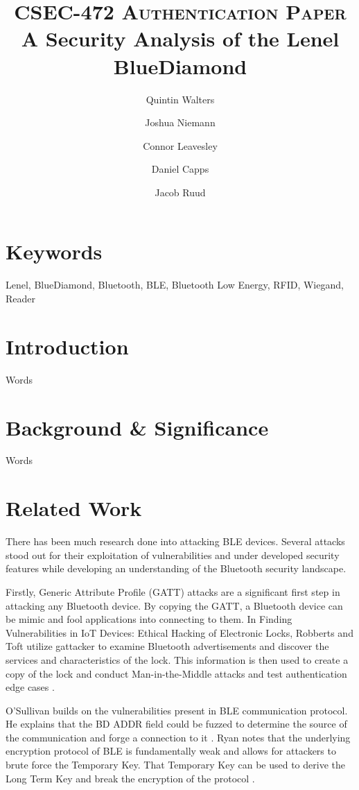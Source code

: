 \documentclass[10pt,twocolumn,letterpaper]{article}
\title{
		\vspace{-1in} 	
		\usefont{OT1}{bch}{b}{n}
		\normalfont \normalsize \textsc{CSEC-472 Authentication Paper} \\ [14pt]
		\huge A Security Analysis of the Lenel BlueDiamond \\
}
\author[1]{Quintin Walters}
\author[1]{Joshua Niemann}
\author[1]{Connor Leavesley}
\author[1]{Daniel Capps}
\author[1]{Jacob Ruud}
\affil[1]{\small{Computing Security, Rochester Institute of Technology}}
\begin{document}
\maketitle
{}
\begin{abstract}

\end{abstract} 

\section*{Keywords}
Lenel, BlueDiamond, Bluetooth, BLE, Bluetooth Low Energy, RFID, Wiegand, Reader

\section{Introduction}
Words

\section{Background \& Significance}
Words

\section{Related Work}
There has been much research done into attacking BLE devices. Several attacks stood out for their exploitation of vulnerabilities and under developed security features while developing an understanding of the Bluetooth security landscape. 

Firstly, Generic Attribute Profile (GATT) attacks are a significant first step in attacking any Bluetooth device. By copying the GATT, a Bluetooth device can be mimic and fool applications into connecting to them. In Finding Vulnerabilities in IoT Devices: Ethical Hacking of Electronic Locks, Robberts and Toft utilize gattacker to examine Bluetooth advertisements and discover the services and characteristics of the lock. This information is then used to create a copy of the lock and conduct Man-in-the-Middle attacks and test authentication edge cases \cite{KTH}. 

O'Sullivan builds on the vulnerabilities present in BLE communication protocol. He explains that the BD ADDR field could be fuzzed to determine the source of the communication and forge a connection to it \cite{osullivan}. Ryan notes that the underlying encryption protocol of BLE is fundamentally weak and allows for attackers to brute force the Temporary Key. That Temporary Key can be used to derive the Long Term Key and break the encryption of the protocol \cite{mryan13}. 
\end{document}
